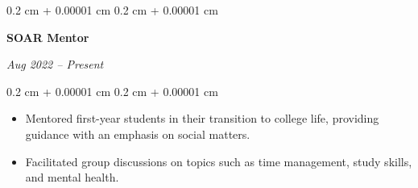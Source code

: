 \documentclass[10pt, letterpaper]{article}
\newenvironment{highlights}{
    \begin{itemize}[
        topsep=0.10 cm,
        parsep=0.10 cm,
        partopsep=0pt,
        itemsep=0pt,
        leftmargin=0.4 cm + 10pt
    ]
}{
    \end{itemize}
} %
\newenvironment{onecolentry}{
    \begin{adjustwidth}{
        0.2 cm + 0.00001 cm
    }{
        0.2 cm + 0.00001 cm
    }
}{
    \end{adjustwidth}
} %
\newenvironment{twocolentry}[2][]{
    \onecolentry
    \def\secondColumn{#2}
    \setcolumnwidth{\fill, 4.5 cm}
    \begin{paracol}{2}
}{
    \switchcolumn \raggedleft \secondColumn
    \end{paracol}
    \endonecolentry
} %
\let\hrefWithoutArrow\href
\renewcommand{\href}[2]{\hrefWithoutArrow{#1}{\ifthenelse{\equal{#2}{}}{ }{#2 }\raisebox{.15ex}{\footnotesize \faExternalLink*}}}
\begin{document}
        
        \begin{samepage}
            \begin{twocolentry}{
                \textit{Aug 2022 – Present}
            }
                \textbf{SOAR Mentor}

                \vspace{0.10 cm}


            \end{twocolentry}


            \vspace{0.10 cm}

            \begin{onecolentry}
                \begin{highlights}
                    \item Mentored first-year students in their transition to college life, providing guidance with an emphasis on social matters.
                    \item Facilitated group discussions on topics such as time management, study skills, and mental health.
                \end{highlights}
            \end{onecolentry}
        \end{samepage}




    



        
            
            

\end{document}
